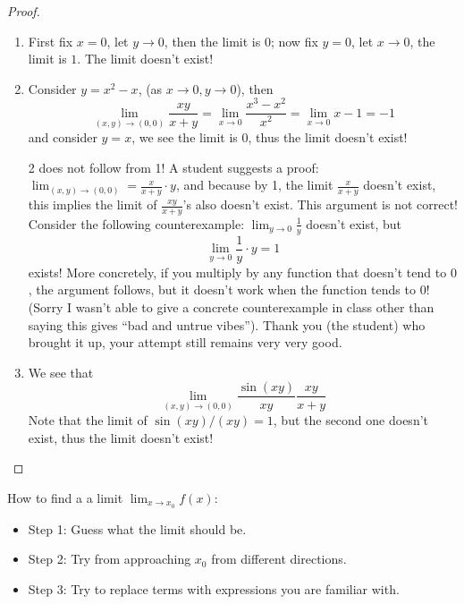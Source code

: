 \documentclass[openany]{book}
\begin{document}
\begin{proof}
    \begin{enumerate}
        \item First fix $x=0$, let $y\to 0$, then the limit is $0$; now fix $y=0$, let $x\to 0$, the limit is $1$. The limit doesn't exist!
        \item Consider $y=x^2-x$, (as $x\to0, y\to 0$), then 
        \begin{equation*}
            \lim_{(x,y)\to(0,0)}\frac{xy}{x+y}=\lim_{x\to 0}\frac{x^3-x^2}{x^2}=\lim_{x\to 0}x-1=-1
        \end{equation*}
        and consider $y=x$, we see the limit is $0$, thus the limit doesn't exist!
        \begin{warn}
            2 does not follow from 1! A student suggests a proof: $\lim_{(x,y)\to(0,0)}=\frac{x}{x+y}\cdot y$, and because by 1, the limit $\frac{x}{x+y}$ doesn't exist, this implies the limit of $\frac{xy}{x+y}$'s also doesn't exist. This argument is not correct! Consider the following counterexample: $\lim_{y\to 0}\frac{1}{y}$ doesn't exist, but 
            \begin{equation*}
                \lim_{y\to 0}\frac{1}{y}\cdot y=1
            \end{equation*}
            exists! More concretely, if you multiply by any function that doesn't tend to $0$, the argument follows, but it doesn't work when the function tends to $0$! (Sorry I wasn't able to give a concrete counterexample in class other than saying this gives ``bad and untrue vibes''). Thank you (the student) who brought it up, your attempt still remains very very good.
        \end{warn}
        \item We see that 
        \begin{equation*}
            \lim_{(x,y)\to(0,0)}\frac{\sin(xy)}{xy}\frac{xy}{x+y}
        \end{equation*}
        Note that the limit of $\sin(xy)/(xy)=1$, but the second one doesn't exist, thus the limit doesn't exist!
    \end{enumerate}
\end{proof}


\noindent
How to find a a limit $\lim_{x\to x_0}f(x)$:
\begin{itemize}
    \item Step 1: Guess what the limit should be.
    \item Step 2: Try from approaching $x_0$ from different directions.
    \item Step 3: Try to replace terms with expressions you are familiar with.
\end{itemize}
\end{document}
